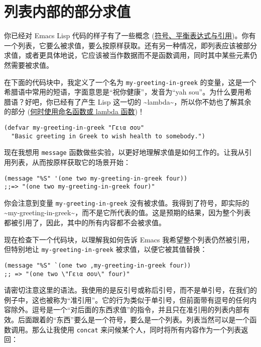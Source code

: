 \documentclass[11pt]{ctexart}
\begin{document}
\section{列表内部的部分求值}
\label{sec:org7fa9c71}
你已经对 Emacs Lisp 代码的样子有了一些概念 (\hyperref[sec:orgb51d706]{符号、平衡表达式与引用})。你有一个列表，它要么被求值，要么按原样获取。还有另一种情况，即列表应该被部分求值，或者更具体地说，它应该被当作数据而不是函数调用，同时其中某些元素仍然需要被求值。

在下面的代码块中，我定义了一个名为 \texttt{my-greeting-in-greek} 的变量，这是一个希腊语中常用的短语，字面意思是“祝你健康”，发音为“yah sou”。为什么要用希腊语？好吧，你已经有了产生 Lisp 这一切的 \textasciitilde{}lambda\textasciitilde{}，所以你不妨也了解其余的部分 (\hyperref[sec:orgf242639]{何时使用命名函数或 lambda 函数})！

\begin{verbatim}
(defvar my-greeting-in-greek "Γεια σου"
  "Basic greeting in Greek to wish health to somebody.")
\end{verbatim}

现在我想用 \texttt{message} 函数做些实验，以更好地理解求值是如何工作的。让我从引用列表，从而按原样获取它的场景开始：

\begin{verbatim}
(message "%S" '(one two my-greeting-in-greek four))
;;=> "(one two my-greeting-in-greek four)"
\end{verbatim}

你会注意到变量 \texttt{my-greeting-in-greek} 没有被求值。我得到了符号，即实际的 \textasciitilde{}my-greeting-in-greek\textasciitilde{}，而不是它所代表的值。这是预期的结果，因为整个列表都被引用了，因此，其中的所有内容都不会被求值。

现在检查下一个代码块，以理解我如何告诉 Emacs 我希望整个列表仍然被引用，但特别地让 \texttt{my-greeting-in-greek} 被求值，以便它被其值替换：

\begin{verbatim}
(message "%S" `(one two ,my-greeting-in-greek four))
;; => "(one two \"Γεια σου\" four)"
\end{verbatim}

请密切注意这里的语法。我使用的是反引号或称后引号，而不是单引号，在我们的例子中，这也被称为“准引用”。它的行为类似于单引号，但前面带有逗号的任何内容除外。逗号是一个“对后面的东西求值”的指令，并且只在准引用的列表内部有效。后面跟着的“东西”要么是一个符号，要么是一个列表。列表当然可以是一个函数调用。那么让我使用 \texttt{concat} 来问候某个人，同时将所有内容作为一个列表返回：
\end{document}
